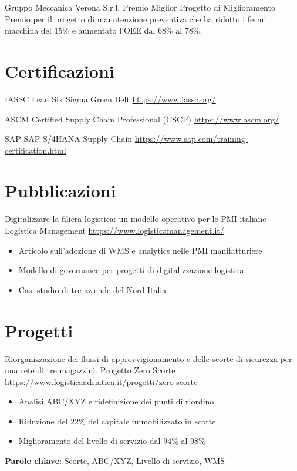 \documentclass[a4paper, serif, 10pt]{moderncv}
\begin{document}
        {Gruppo Meccanica Verona S.r.l.}
        {Premio Miglior Progetto di Miglioramento}
        {}
        {}
        {Premio per il progetto di manutenzione preventiva che ha ridotto i fermi macchina del 15\% e aumentato l'OEE dal 68\% al 78\%.}
\section{Certificazioni}

        {IASSC}
        {Lean Six Sigma Green Belt}
        {\url{https://www.iassc.org/}}
        {}
        {}

        {ASCM}
        {Certified Supply Chain Professional (CSCP)}
        {\url{https://www.ascm.org/}}
        {}
        {}

        {SAP}
        {SAP S/4HANA Supply Chain}
        {\url{https://www.sap.com/training-certification.html}}
        {}
        {}
\section{Pubblicazioni}

        {Digitalizzare la filiera logistica: un modello operativo per le PMI italiane}
        {Logistica Management}
        {\url{https://www.logisticamanagement.it/}}
        {}
        {\begin{itemize}
\item Articolo sull'adozione di WMS e analytics nelle PMI manifatturiere
\item Modello di governance per progetti di digitalizzazione logistica
\item Casi studio di tre aziende del Nord Italia
\end{itemize}}
\section{Progetti}

        {Riorganizzazione dei flussi di approvvigionamento e delle scorte di sicurezza per una rete di tre magazzini.}
        {Progetto Zero Scorte}
        {\url{https://www.logisticaadriatica.it/progetti/zero-scorte}}
        {}
        {\begin{itemize}
\item Analisi ABC/XYZ e ridefinizione dei punti di riordino
\item Riduzione del 22\% del capitale immobilizzato in scorte
\item Miglioramento del livello di servizio dal 94\% al 98\%
\end{itemize}
\textbf{Parole chiave}: Scorte, ABC/XYZ, Livello di servizio, WMS}
\end{document}
